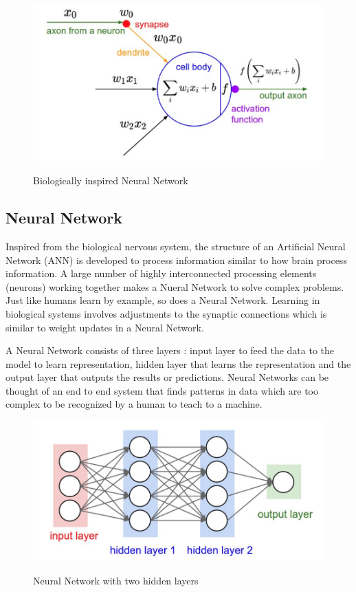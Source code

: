 \begin{figure}[H]
\begin{center}
\includegraphics[height=.28\textheight]{Chapter2/Figs/NeuralNetwork.png}
\label{fig:Neural_Network}
\caption{Biologically inspired Neural Network \cite{karparthy}}
\end{center}
\end{figure}

\subsection{Neural Network}

Inspired from the biological nervous system, the structure of an Artificial Neural Network (ANN) is developed to process information similar to how brain process information. A large number of highly interconnected processing elements (neurons) working together makes a Nueral Network to solve complex problems. Just like humans learn by example, so does a Neural Network. Learning in biological systems involves adjustments to the synaptic connections which is similar to weight updates in a Neural Network. 

A Neural Network consists of three layers : input layer to feed the data to the model to learn representation, hidden layer that learns the representation and the output layer that outputs the results or predictions. Neural Networks can be thought of an end to end system that finds patterns in data which are too complex to be recognized by a human to teach to a machine. 


\begin{figure}[H]
\begin{center}
\includegraphics[height=.28\textheight]{Chapter2/Figs/TwoLayeredNN.png}
\label{fig:Two Layered Neural_Network}
\caption{Neural Network with two hidden layers \cite{karparthy}}
\end{center}
\end{figure}


